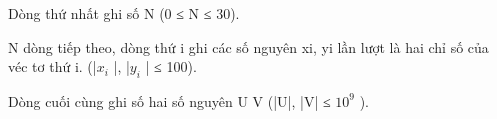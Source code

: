Dòng thứ nhất ghi số N (0 ≤ N ≤ 30).  

   N dòng tiếp theo, dòng thứ i ghi các số nguyên xi, yi lần lượt là hai chỉ số của véc tơ thứ i. (|$x_{i}$   |, |$y_{i}$   | ≤ 100).  

   Dòng cuối cùng ghi số hai số nguyên U V (|U|, |V| ≤ $10^{9}$   ).